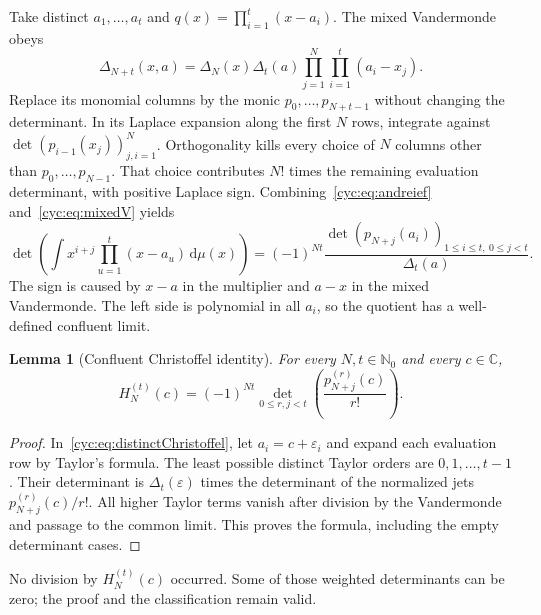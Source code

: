 \documentclass[11pt,a4paper]{article}
\numberwithin{equation}{section}
\newtheorem{lemma}[theorem]{Lemma}
\theoremstyle{definition}
\theoremstyle{remark}
\newcommand{\NN}{\mathbb N_0}
\newcommand{\CC}{\mathbb C}
\newcommand{\dd}{\mathrm d}
\newcommand{\cH}[2]{H_{#1}^{(#2)}}
\begin{document}
Take distinct $a_1,\ldots,a_t$ and $q(x)=\prod_{i=1}^t(x-a_i)$.
The mixed Vandermonde obeys
\begin{equation}\label{cyc:eq:mixedV}
 \Delta_{N+t}(x,a)=\Delta_N(x)\Delta_t(a)
                   \prod_{j=1}^{N}\prod_{i=1}^{t}(a_i-x_j).
\end{equation}
Replace its monomial columns by the monic $p_0,\ldots,p_{N+t-1}$
without changing the determinant.  In its Laplace expansion along the
first $N$ rows, integrate against
$\det(p_{i-1}(x_j))_{j,i=1}^N$.  Orthogonality kills every choice of
$N$ columns other than $p_0,\ldots,p_{N-1}$.  That choice contributes
$N!$ times the remaining evaluation determinant, with positive Laplace
sign.  Combining~\eqref{cyc:eq:andreief} and~\eqref{cyc:eq:mixedV} yields
\begin{equation}\label{cyc:eq:distinctChristoffel}
 \det\left(\int x^{i+j}\prod_{u=1}^t(x-a_u)\,\dd\mu(x)\right)
 =(-1)^{Nt}\frac{\det(p_{N+j}(a_i))_{1\le i\le t,\ 0\le j<t}}
                         {\Delta_t(a)}.
\end{equation}
The sign is caused by $x-a$ in the multiplier and $a-x$ in the mixed
Vandermonde.  The left side is polynomial in all $a_i$, so the quotient
has a well-defined confluent limit.

\begin{lemma}[Confluent Christoffel identity]\label{cyc:lem:Christoffel}
For every $N,t\in\NN$ and every $c\in\CC$,
\begin{equation}\label{cyc:eq:Christoffel}
 \cH Nt(c)=(-1)^{Nt}
       \det_{0\le r,j<t}\left(\frac{p_{N+j}^{(r)}(c)}{r!}\right).
\end{equation}
\end{lemma}
\begin{proof}
In~\eqref{cyc:eq:distinctChristoffel}, let $a_i=c+\varepsilon_i$ and expand
each evaluation row by Taylor's formula.  The least possible distinct
Taylor orders are $0,1,\ldots,t-1$.  Their determinant is
$\Delta_t(\varepsilon)$ times the determinant of the normalized
jets $p_{N+j}^{(r)}(c)/r!$.  All higher Taylor terms vanish after division
by the Vandermonde and passage to the common limit.  This proves the
formula, including the empty determinant cases.
\end{proof}

No division by $\cH Nt(c)$ occurred.  Some of those weighted
determinants can be zero; the proof and the classification remain valid.

\noindent[Merge note: Lemma~\ref{cyc:lem:Christoffel} is Part~II's
\eqref{rc:eq:Christoffel} for $q=(x-c)^t$, derived here a second time;
Part~I's Lemma~\ref{lem:Christoffel} and Proposition~\ref{prop:confluent}
are further special cases, and the measure and orthogonality above repeat
Part~I's Section~\ref{sec:coeffproof} and Part~II's
Section~\ref{rc:sec:classical}.  The recursion \eqref{cyc:eq:prec} is
Part~II's \eqref{rc:eq:prec}.  In \eqref{cyc:eq:distinctChristoffel} the
manuscript prints the multiplier as $\prod_{a=1}^t(x-a_a)$; the product
index is written $u$ here (as in Part~II), since $i$ is a row index.]
\end{document}
